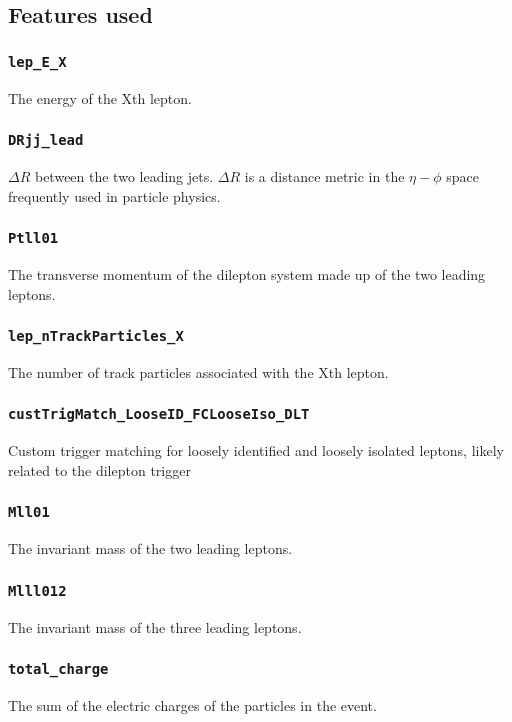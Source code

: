 \clearpage \subsection{Features used}

\subsubsection{\texttt{lep\_E\_X}} The energy of the Xth lepton.

\subsubsection{\texttt{DRjj\_lead}} $\Delta R$ between the two leading jets. $\Delta R$ is a distance metric in the
$\eta-\phi$ space frequently used in particle physics.

\subsubsection{\texttt{Ptll01}} The transverse momentum of the dilepton system made up of the two leading leptons.

\subsubsection{\texttt{lep\_nTrackParticles\_X}} The number of track particles associated with the Xth lepton.

\subsubsection{\texttt{custTrigMatch\_LooseID\_FCLooseIso\_DLT}} Custom trigger matching for loosely identified and loosely
isolated leptons, likely related to the dilepton trigger

\subsubsection{\texttt{Mll01}} The invariant mass of the two leading leptons.

\subsubsection{\texttt{Mlll012}} The invariant mass of the three leading leptons.

\subsubsection{\texttt{total\_charge}} The sum of the electric charges of the particles in the event.

